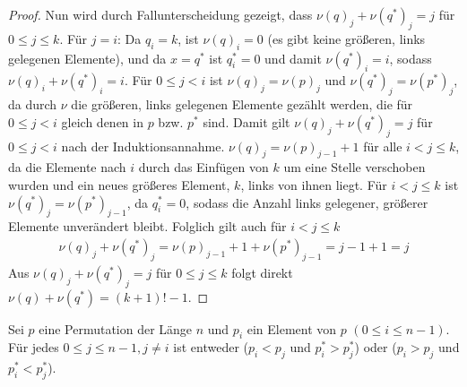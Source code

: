 \documentclass[a4paper, 10pt, ngerman]{article}
\begin{document}
\begin{proof}
    Nun wird durch Fallunterscheidung gezeigt, dass $\nu(q)_j + \nu(q^*)_j = j$ für $0 \le j \le k$. Für $j = i$: Da $q_i = k$, ist $\nu(q)_i = 0$ (es gibt keine größeren, links gelegenen Elemente), und da $x = q^*$ ist $q^*_i = 0$ und damit $\nu(q^*)_i = i$, sodass $\nu(q)_i + \nu(q^*)_i = i$. Für $0 \le j < i$ ist $\nu(q)_j = \nu(p)_j$ und $\nu(q^*)_j = \nu(p^*)_j$, da durch $\nu$ die größeren, links gelegenen Elemente gezählt werden, die für $0 \le j < i$ gleich denen in $p$ bzw. $p^*$ sind. Damit gilt $\nu(q)_j + \nu(q^*)_j = j$ für $0 \le j < i$ nach der Induktionsannahme. $\nu(q)_j = \nu(p)_{j - 1} + 1$ für alle $i < j \le k$, da die Elemente nach $i$ durch das Einfügen von $k$ um eine Stelle verschoben wurden und ein neues größeres Element, $k$, links von ihnen liegt. Für $i < j \le k$ ist $\nu(q^*)_j = \nu(p^*)_{j-1}$, da $q^*_i = 0$, sodass die Anzahl links gelegener, größerer Elemente unverändert bleibt. Folglich gilt auch für $i < j \le k$
    \begin{align*}
        \nu(q)_j + \nu(q^*)_j = \nu(p)_{j - 1} + 1 + \nu(p^*)_{j - 1} = j - 1 + 1 = j 
    \end{align*}
    Aus $\nu(q)_j + \nu(q^*)_j = j$ für $0 \le j \le k$ folgt direkt $\nu(q) + \nu(q^*) = (k + 1)! - 1$.
\end{proof}

\begin{lemma}
    Sei $p$ eine Permutation der Länge $n$ und $p_i$ ein Element von $p$ $(0 \le i \le n - 1)$. Für jedes $0 \le j \le n-1, j \ne i$ ist entweder ($p_i < p_j$ und $p^*_i > p^*_j$) oder ($p_i > p_j$ und $p^*_i < p^*_j$).
\end{lemma}
\end{document}
